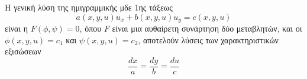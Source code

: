 \begin{mybox2}
\begin{thm}
  Η γενική λύση της ημιγραμμικής μδε 1ης τάξεως 
  \[
    a(x,y,u)u_{x} + b(x,y,u)u_{y} = c(x,y,u) 
  \] 
  είναι η $ F(\phi, \psi) = 0 $, όπου $F$ είναι μια αυθαίρετη συνάρτηση δύο μεταβλητών,
  και οι $ \phi (x,y,u) = c_{1} $ και $ \psi (x,y,u) = c_{2} $, αποτελούν λύσεις των 
  χαρακτηριστικών εξισώσεων
  \[
    \frac{dx}{a} = \frac{dy}{b} = \frac{du}{c} 
  \] 
\end{thm}
\end{mybox2}








